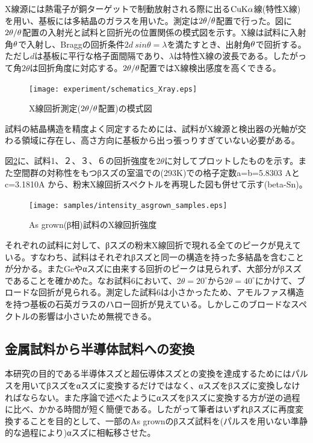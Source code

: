 X線源には熱電子が銅ターゲットで制動放射される際に出る$\rm CuK\alpha$線(特性X線)を用い、基板には多結晶のガラスを用いた。測定は$\rm 2\theta/\theta$配置で行った。図に$\rm 2\theta/\theta$配置の入射光と試料と回折光の位置関係の模式図を示す。X線は試料に入射角$\rm \theta$で入射し、Braggの回折条件$2d\:sin\theta=\lambda$を満たすとき、出射角$\rm \theta$で回折する。ただし$d$は基板に平行な格子面間隔であり、$\lambda$は特性X線の波長である。したがって角$2\theta$は回折角度に対応する。$\rm 2\theta/\theta$配置ではX線検出感度を高くできる。
\begin{figure}[!h]
    \begin{center}
   \texttt{[image: experiment/schematics\_Xray.eps]}
  \end{center}
  \caption{X線回折測定($\rm 2\theta/\theta$配置)の模式図}
  \label{fig:schematics_Xray}
\end{figure}

試料の結晶構造を精度よく同定するためには、試料がX線源と検出器の光軸が交わる領域に存在し、高さ方向に基板から出っ張っりすぎていない必要がある。

図\ref{fig:intensity_asgrown_samples}に、試料1、２、３、６の回折強度を$2\theta$に対してプロットしたものを示す。また空間群の対称性をもつβスズの室温での(293K)での格子定数a=b=5.8303 Aとc=3.1810A \cite{Wolcyrz}から、粉末X線回折スペクトルを再現した図も併せて示す(beta-Sn)。
\begin{figure}[!h]
    \begin{center}
   \texttt{[image: samples/intensity\_asgrown\_samples.eps]}
  \end{center}
  \caption{As grown(β相)試料のX線回折強度}
  \label{fig:intensity_asgrown_samples}
\end{figure}

それぞれの試料に対して、βスズの粉末X線回折で現れる全てのピークが見えている。すなわち、試料はそれぞれβスズと同一の構造を持った多結晶を含むことが分かる。またGeやαスズに由来する回折のピークは見られず、大部分がβスズであることを確かめた。なお試料6において、$2\theta=20^\circ$から$2\theta=40^\circ$にかけて、ブロードな回折が見られる。測定した試料6は小さかったため、アモルファス構造を持つ基板の石英ガラスのハロー回折\cite{Speakman}が見えている。しかしこのブロードなスペクトルの影響は小さいため無視できる。

\subsection{金属試料から半導体試料への変換}
本研究の目的である半導体スズと超伝導体スズとの変換を達成するためにはパルスを用いてβスズをαスズに変換するだけではなく、αスズをβスズに変換しなければならない。また序論で述べたようにαスズをβスズに変換する方が逆の過程に比べ、かかる時間が短く簡便である。したがって筆者はいずれβスズに再度変換することを目的として、一部のAs grownのβスズ試料を(パルスを用いない準静的な過程により)αスズに相転移させた。

